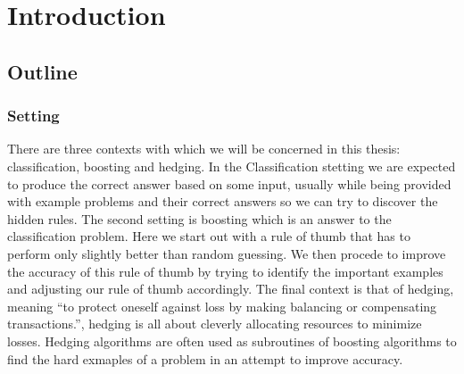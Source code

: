 
\chapter{Introduction}
\label{chap:intro}


\section{Outline}
\subsection{Setting}
There are three contexts with which we will be concerned in this thesis: classification, boosting and hedging.
In the Classification stetting we are expected to produce the correct answer based on some input, usually while being provided with example problems and their correct answers so we can try to discover the hidden rules. The second setting is boosting which is an answer to the classification problem. Here we start out with a rule of thumb that has to perform only slightly better than random guessing. We then procede to improve the accuracy of this rule of thumb by trying to identify the important examples and adjusting our rule of thumb accordingly. The final context is that of hedging, meaning ``to protect oneself against loss by making balancing or compensating transactions.'', hedging is all about cleverly allocating resources to minimize losses. Hedging algorithms are often used as subroutines of boosting algorithms to find the hard exmaples of a problem in an attempt to improve accuracy.

